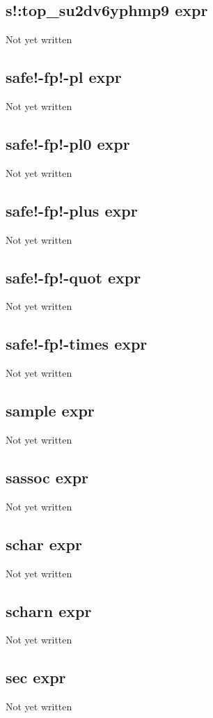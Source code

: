 \documentclass[a4paper,11pt]{article}
\begin{document}
\subsection{\ttfamily s!:top\_su2dv6yphmp9 expr}
Not yet written

\subsection{\ttfamily safe!-fp!-pl expr}
Not yet written

\subsection{\ttfamily safe!-fp!-pl0 expr}
Not yet written

\subsection{\ttfamily safe!-fp!-plus expr}
Not yet written

\subsection{\ttfamily safe!-fp!-quot expr}
Not yet written

\subsection{\ttfamily safe!-fp!-times expr}
Not yet written

\subsection{\ttfamily sample expr}
Not yet written

\subsection{\ttfamily sassoc expr}
Not yet written

\subsection{\ttfamily schar expr}
Not yet written

\subsection{\ttfamily scharn expr}
Not yet written

\subsection{\ttfamily sec expr}
Not yet written
\end{document}
